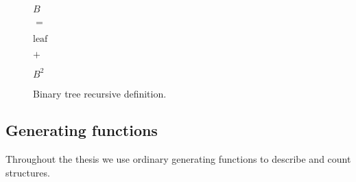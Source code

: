 \documentclass[final]{article}
\theoremstyle{definition}
\theoremstyle{definition}
\theoremstyle{remark}
\begin{document}
\begin{figure}[H]
    \begin{center}
        \begin{minipage}[t]{.2\textwidth}
            \begin{center}
                \(B\)\\
            \end{center}
        \end{minipage}%
        \begin{minipage}[t]{.05\textwidth}
            \begin{center}
                \(=\)\\
            \end{center}
        \end{minipage}%
        \begin{minipage}[t]{.2\textwidth}
            \begin{center}
                \(\text{leaf}\)\\
            \end{center}
        \end{minipage}%
        \begin{minipage}[t]{.05\textwidth}
            \begin{center}
                \(+\)\\
            \end{center}
        \end{minipage}%
        \begin{minipage}[t]{.2\textwidth}
            \begin{center}
                \(B^2\)\\
            \end{center}
        \end{minipage}%
    \end{center}
    \caption{Binary tree recursive definition.}%
    \label{fig:binary_recursion}
\end{figure}

\subsection{Generating functions}%
\label{sub:generating_functions}

Throughout the thesis we use ordinary generating functions to describe and count structures.
\end{document}

